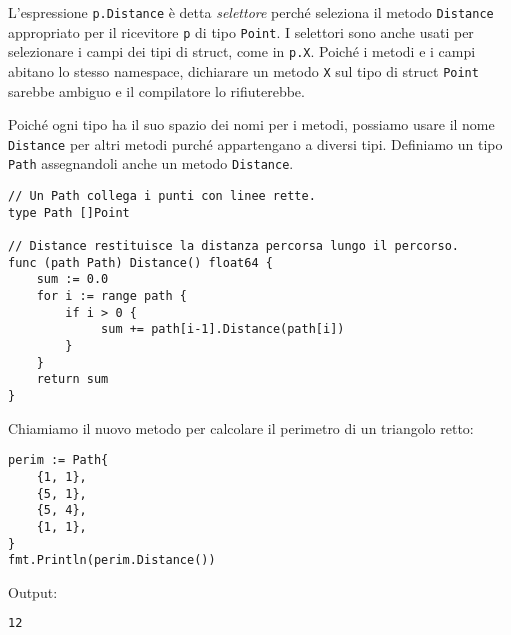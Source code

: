 \documentclass[../../thesis.tex]{subfiles}
\begin{document}
    L'espressione \verb"p.Distance" è detta \textit{selettore} perché seleziona il metodo \verb"Distance" appropriato per il ricevitore \verb"p" di tipo \verb"Point".
    I selettori sono anche usati per selezionare i campi dei tipi di struct, come in \verb"p.X".
    Poiché i metodi e i campi abitano lo stesso namespace, dichiarare un metodo \verb"X" sul tipo di struct \verb"Point" sarebbe ambiguo e il compilatore lo rifiuterebbe.
    \hfill \vspace{12pt}

    Poiché ogni tipo ha il suo spazio dei nomi per i metodi, possiamo usare il nome \verb"Distance" per altri metodi purché appartengano a diversi tipi.
    Definiamo un tipo \verb"Path" assegnandoli anche un metodo \verb"Distance".
    \begin{lstlisting}[frame = single, label = {lst:lstlisting5-1.4}]
// Un Path collega i punti con linee rette.
type Path []Point

// Distance restituisce la distanza percorsa lungo il percorso.
func (path Path) Distance() float64 {
    sum := 0.0
    for i := range path {
        if i > 0 {
             sum += path[i-1].Distance(path[i])
        }
    }
    return sum
}
    \end{lstlisting}
    Chiamiamo il nuovo metodo per calcolare il perimetro di un triangolo retto:
    \begin{lstlisting}[frame = single, label = {lst:lstlisting5-1.5}]
perim := Path{
    {1, 1},
    {5, 1},
    {5, 4},
    {1, 1},
}
fmt.Println(perim.Distance())
    \end{lstlisting}
    Output:
    \begin{lstlisting}[language = bash, frame = L, label = {lst:lstlisting5-1.6}]
12
    \end{lstlisting}
\end{document}
